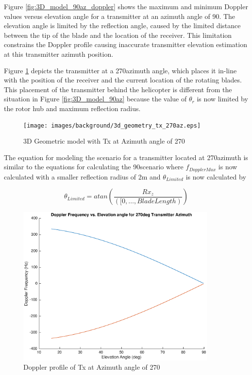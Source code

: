 Figure \ref{fig:3D_model_90az_doppler} shows the maximum and minimum Doppler values versus elevation angle for a transmitter at an azimuth angle of 90\textdegree. The elevation angle is limited by the reflection angle, caused by the limited distance between the tip of the blade and the location of the receiver. This limitation constrains the Doppler profile causing inaccurate transmitter elevation estimation at this transmitter azimuth position.

Figure \ref{fig:3D_model_270az} depicts the transmitter at a 270\textdegree \space azimuth angle, which places it in-line with the position of the receiver and the current location of the rotating blades. This placement of the transmitter behind the helicopter is different from the situation in Figure \ref{fig:3D_model_90az} because the value of $\theta_r$ is now limited by the  rotor hub and maximum reflection radius.

\begin{figure}
	\begin{center}
		\texttt{[image: images/background/3d\_geometry\_tx\_270az.eps]}
		\caption{3D Geometric model with Tx at Azimuth angle of 270\textdegree}
		\label{fig:3D_model_270az}
	\end{center}
\end{figure}

The equation for modeling the scenario for a transmitter located at 270\textdegree \space azimuth is similar to the equations for calculating the 90\textdegree \space scenario where $f_{DopplerMax}$ is now calculated with a smaller reflection radius of 2m and $\theta_{Limited}$ is now calculated by

\begin{equation}
	\theta_{Limited} = atan\left(\frac{Rx_z}{([0, \dots, BladeLength)}\right)
	\label{eq:theory_270_limited}
\end{equation}

\begin{figure}
	\begin{center}
		\includegraphics[width=10cm]{images/background/3d_geometry_tx_270az_doppler_profile.eps}
		\caption{Doppler profile of Tx at Azimuth angle of 270\textdegree}
		\label{fig:3D_model_270az_doppler}
	\end{center}
\end{figure}

